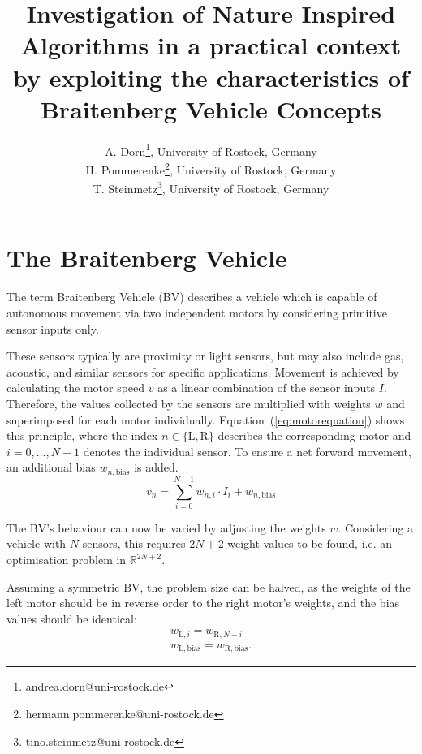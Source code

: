 \documentclass[a4paper]{jacow}
\begin{document}
\title{Investigation of Nature Inspired Algorithms in a practical context by exploiting the characteristics of Braitenberg Vehicle Concepts}

\author{A. Dorn\thanks{andrea.dorn@uni-rostock.de}, University of Rostock, Germany \\
		H. Pommerenke\thanks{hermann.pommerenke@uni-rostock.de}, University of Rostock, Germany \\
		T. Steinmetz\thanks{tino.steinmetz@uni-rostock.de}, University of Rostock, Germany}
	
\maketitle


\section{The Braitenberg Vehicle}

The term Braitenberg Vehicle (BV) describes a vehicle which is capable of autonomous movement via two independent motors by considering primitive sensor inputs only.

These sensors typically are proximity or light sensors, but may also include gas, acoustic, and similar sensors for specific applications. Movement is achieved by calculating the motor speed $v$ as a linear combination of the sensor inputs $I$. Therefore, the values collected by the sensors are multiplied with weights $w$ and superimposed for each motor individually. Equation~(\ref{eq:motorequation}) shows this principle, where the index $n\in\{\mathrm{L},\mathrm{R}\}$ describes the corresponding motor and $i=0,\ldots,N-1$ denotes the individual sensor. To ensure a net forward movement, an additional bias $w_{n,\text{bias}}$ is added.
\begin{equation}
	v_{n} = \sum\limits_{i=0}^{N-1} w_{n,i}\cdot I_{i} + w_{n,\text{bias}}
	\label{eq:motorequation}
\end{equation}

The BV's behaviour can now be varied by adjusting the weights $w$. Considering a vehicle with $N$ sensors, this requires $2N+2$ weight values to be found, i.e. an optimisation problem in $\mathbb{R}^{2N+2}$.

Assuming a symmetric BV, the problem size can be halved, as the weights of the left motor should be in reverse order to the right motor's weights, and the bias values should be identical:
\begin{align}
	w_{\mathrm{L}, i} = w_{\mathrm{R}, N-i} \nonumber \\
	w_{\mathrm{L},\text{bias}} = w_{\mathrm{R},\text{bias}}.\label{eq:symmetry}
\end{align}
\end{document}
